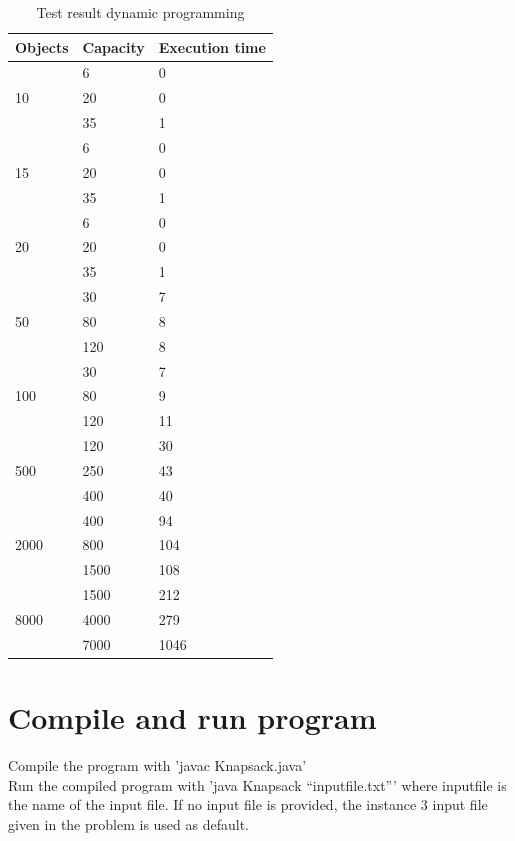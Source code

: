 \documentclass{inc/mas}
\begin{document}
\begin{table}
\begin{center}
\caption{Test result dynamic programming}
\begin{tabular}{|l|l|l|} \hline
Objects &Capacity &Execution time\\ \hline
\multirow{3}{*}{10} & 6 & 0 \\
& 20 & 0 \\
& 35 & 1 \\ \hline
\multirow{3}{*}{15} & 6 & 0 \\
& 20 & 0 \\
& 35 & 1 \\ \hline
\multirow{3}{*}{20} & 6 & 0 \\
& 20 & 0 \\
& 35 & 1 \\ \hline
\multirow{3}{*}{50} & 30 & 7 \\
& 80 & 8 \\
& 120 & 8 \\ \hline
\multirow{3}{*}{100} & 30 & 7 \\
& 80 & 9 \\
& 120 & 11 \\ \hline
\multirow{3}{*}{500} & 120 & 30 \\
& 250 & 43 \\
& 400 & 40 \\ \hline
\multirow{3}{*}{2000} & 400 & 94 \\
& 800 & 104 \\
& 1500 & 108 \\ \hline
\multirow{3}{*}{8000} & 1500 & 212 \\
& 4000 & 279 \\
& 7000 & 1046 \\ \hline
\end{tabular}
\end{center}
\end{table}

\appendix
\section{Compile and run program}
\noindent Compile the program with 'javac Knapsack.java'\\ 
\noindent Run the compiled program with 'java Knapsack ``inputfile.txt''' where inputfile is the name of the input file. If no input file is provided, the instance 3 input file given in the problem is used as default. 


\end{document}
